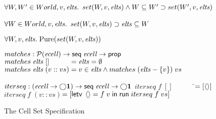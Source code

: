 \begin{figure}
\begin{specification}
$\forall W, W' \in World, v, \mathit{elts}.$ \nextline
\>$set(W,v,\mathit{elts}) \land W \subseteq W' \supset set(W',v, \mathit{elts})$\nextline[1em]

$\forall W \in World, v, \mathit{elts}.$ \nextline
\>$set(W, v, \mathit{elts}) \supset \mathit{elts} \subseteq W$ \nextline[1em]

$\forall W, v, \mathit{elts}.\; \mathrm{Pure}(set(W,v,\mathit{elts}))$ \nextline[1em]
  
$matches : \mathcal{P}(\mathit{ecell}) \to \mathsf{seq}\;{\mathit{ecell}} \to \mathsf{prop}$ \nextline
$matches\;\mathit{elts}\;[] \qquad\;\;\; = \mathit{elts} = \emptyset$ \nextline
$matches\;\mathit{elts}\;(v :: vs) = v \in \mathit{elts} \land matches\;(\mathit{elts} - \{{v}\})\;vs$\nextline[1em]

$iterseq : (\mathit{ecell} \to \bigcirc{\mathbf{1}}) \to \mathsf{seq}\;{\mathit{ecell}} \to \bigcirc{\mathbf{1}}$ \nextline
$iterseq\; f\; [] \qquad\;\;\;\;$\=$= [\left<\right>]$ \nextline
$iterseq\; f\; (v :: vs)$\>$= [\mathsf{letv}\;\left<\right> = f\;v\;\mathsf{in}\;\mathsf{run}\;iterseq\;f\;vs]$
\end{specification}
\caption{The Cell Set Specification}
\label{cellset-spec}
\end{figure}


